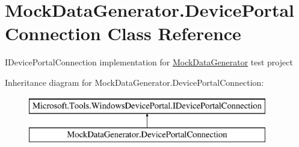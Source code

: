 \hypertarget{class_mock_data_generator_1_1_device_portal_connection}{}\section{Mock\+Data\+Generator.\+Device\+Portal\+Connection Class Reference}
\label{class_mock_data_generator_1_1_device_portal_connection}


I\+Device\+Portal\+Connection implementation for \hyperlink{namespace_mock_data_generator}{Mock\+Data\+Generator} test project  


Inheritance diagram for Mock\+Data\+Generator.\+Device\+Portal\+Connection\+:\begin{figure}[H]
\begin{center}
\leavevmode
\includegraphics[height=2.000000cm]{class_mock_data_generator_1_1_device_portal_connection}
\end{center}
\end{figure}
